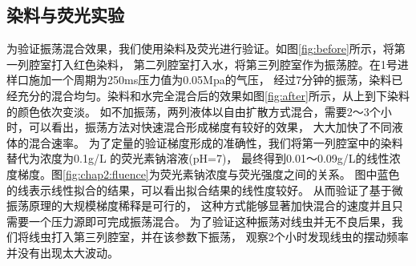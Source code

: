 \subsection{染料与荧光实验}
为验证振荡混合效果，我们使用染料及荧光进行验证。如图\ref{fig:before}所示，将第一列腔室打入红色染料，
第二列腔室打入水，将第三列腔室作为振荡腔。在1号进样口施加一个周期为250ms压力值为0.05Mpa的气压，
经过7分钟的振荡，染料已经充分的混合均匀。染料和水完全混合后的效果如图\ref{fig:after}所示，从上到下染料的颜色依次变淡。
如不加振荡，两列液体以自由扩散方式混合，需要2～3个小时，可以看出，振荡方法对快速混合形成梯度有较好的效果，
大大加快了不同液体的混合速率。
为了定量的验证梯度形成的准确性，我们将第一列腔室中的染料替代为浓度为0.1g/L 的荧光素钠溶液(pH=7)，
最终得到0.01～0.09g/L的线性浓度梯度。图\ref{fig:chap2:fluence}为荧光素钠浓度与荧光强度之间的关系。
图中蓝色的线表示线性拟合的结果，可以看出拟合结果的线性度较好。
从而验证了基于微振荡原理的大规模梯度稀释是可行的，
这种方式能够显著加快混合的速度并且只需要一个压力源即可完成振荡混合。
为了验证这种振荡对线虫并无不良后果，我们将线虫打入第三列腔室，并在该参数下振荡，
观察2个小时发现线虫的摆动频率并没有出现太大波动。

